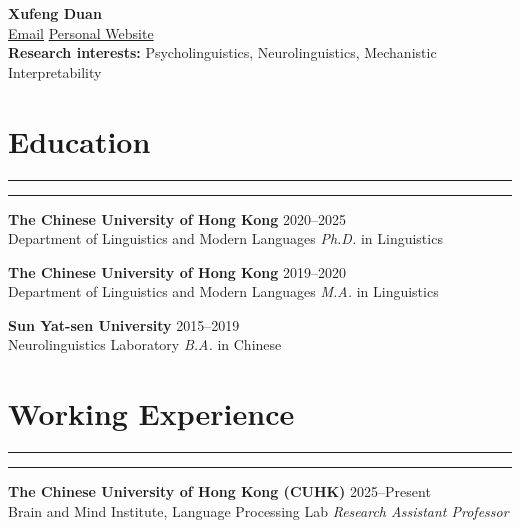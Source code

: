 \documentclass[11pt,a4paper]{article}
\begin{document}
\begin{center}
    {\Large \textbf{Xufeng Duan}}\\[6pt]
    \href{mailto:xufeng.duan@link.cuhk.edu.hk}{Email}  \quad 
    \href{https://xufengduan.github.io/}{Personal Website}\\
\textbf{Research interests:} Psycholinguistics, Neurolinguistics, Mechanistic Interpretability
\end{center}

\vspace{-2.5em} 
\section*{Education}
\vspace{-.5em} 
\hrule
\vspace{0.3ex}
\hrule
\textbf{The Chinese University of Hong Kong} \hfill 2020--2025\\
Department of Linguistics and Modern Languages \hfill \textit{Ph.D.} in Linguistics


\textbf{The Chinese University of Hong Kong} \hfill 2019--2020\\
Department of Linguistics and Modern Languages \hfill \textit{M.A.} in Linguistics

\textbf{Sun Yat-sen University} \hfill 2015--2019\\
Neurolinguistics Laboratory \hfill \textit{B.A.} in Chinese
\vspace{-1.5em} 
\section*{Working Experience}
\vspace{-.5em}
\hrule
\vspace{0.3ex}
\hrule

\textbf{The Chinese University of Hong Kong (CUHK)} \hfill 2025--Present\\
Brain and Mind Institute, Language Processing Lab \hfill \textit{Research Assistant Professor}
\end{document}
